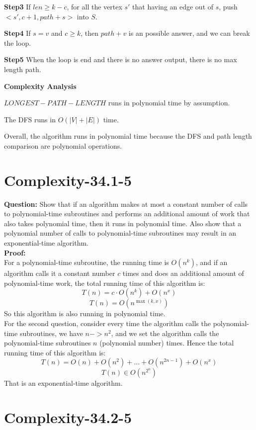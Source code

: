 \documentclass[12pt]{article}
\begin{document}
\textbf{Step3} If $len \geq k-c$, for all the vertex $s'$ that having an edge out of $s$, push $<s', c+1, path+s>$ into $S$.

\textbf{Step4} If $s = v$ and $c \ge k$, then $path + v$ is an possible answer, and we can break the loop.   

\textbf{Step5} When the loop is end and there is no answer output, there is no max length path.

\textbf{Complexity Analysis}

 $LONGEST-PATH-LENGTH$ runs in polynomial time by assumption.

The DFS runs in $O(|V| + |E|)$ time.

Overall, the algorithm runs in polynomial time because the DFS and path length comparison are polynomial operations.



\section{Complexity-34.1-5}
\textbf{Question:} Show that if an algorithm makes at most a constant number of calls to polynomial-time subroutines and performs an additional amount of work that also takes polynomial time, then it runs in polynomial time. Also show that a polynomial number of
calls to polynomial-time subroutines may result in an exponential-time algorithm.\\
\textbf{Proof:}\\
For a polynomial-time subroutine, the running time is \(O(n^k)\), and if an algorithm calls it a constant number \(c\) times and does an additional amount of polynomial-time work, the total running time of this algorithm is:
\[T(n) = c \cdot O(n^k) + O(n^x)\]
\[T(n) = O(n^{\max(k,x)}) \]
So this algorithm is also running in polynomial time. \\
For the second question, consider every time the algorithm calls the polynomial-time subroutines, we have \(n->n^2\), and we set the algorithm calls the polynomial-time subroutines \(n\) (polynomial number) times.
Hence the total running time of this algorithm is:
\[T(n) = O(n) + O(n^2) + ...+O(n^{2n-1}) + O(n^x) \]
\[T(n) \in O(n^{2^n})\]
That is an exponential-time algorithm.



\section{Complexity-34.2-5}
\end{document}
